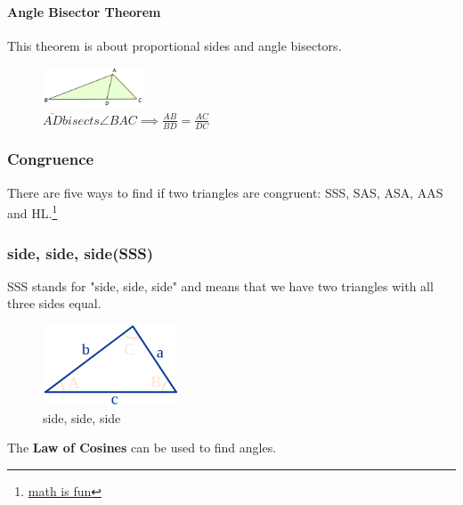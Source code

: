 \paragraph*{Angle Bisector Theorem}
This theorem is about proportional sides and angle bisectors.
\begin{figure}[h!]
    \centering
    \includegraphics[width=3cm]{./public/images/angle-bisector-theorem}
    \caption[side-splitter]{$\overline{AD}  bisects \angle BAC \implies \frac{AB}{BD} = \frac{AC}{DC}$}
\end{figure}

\subsubsection[Congruence]{Congruence} 

There are five ways to find if two triangles are congruent: SSS, SAS, ASA, AAS and HL.\footnote{\href{https://www.mathsisfun.com/geometry/triangles-congruent-finding.html}{math is fun}}

\subsubsection[short]{side, side, side(SSS)}

SSS stands for "side, side, side" and means that we have two triangles with all three sides equal.

\begin{figure}[h!]
    \centering
    \includegraphics[width=4cm]{./public/images/sss}
    \caption[SSS]{side, side, side}
\end{figure}

The \textbf{Law of Cosines} can be used to find angles.